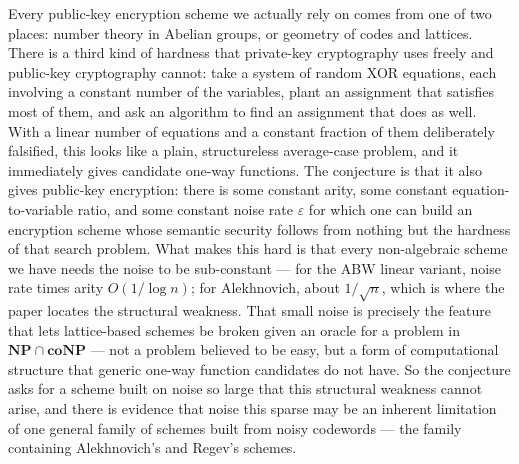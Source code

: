 \documentclass{aicr-conjecture}
\newcommand{\NP}{\mathbf{NP}}
\newcommand{\coNP}{\mathbf{coNP}}
\begin{document}

\vspace{0.4em}

\begin{informalconjecture}
Every public-key encryption scheme we actually rely on comes from one
of two places: number theory in Abelian groups, or geometry of codes
and lattices. There is a third kind of hardness that private-key
cryptography uses freely and public-key cryptography cannot: take a
system of random XOR equations, each involving a constant number of the
variables, plant an assignment that satisfies most of them, and ask an
algorithm to find an assignment that does as well. With a linear number
of equations and a constant fraction of them deliberately falsified,
this looks like a plain, structureless average-case problem, and it
immediately gives candidate one-way functions. The conjecture is that
it also gives public-key encryption: there is some constant arity, some
constant equation-to-variable ratio, and some constant noise rate
$\varepsilon$ for which one can build an encryption scheme whose
semantic security follows from nothing but the hardness of that search
problem. What makes this hard is that every non-algebraic scheme we
have needs the noise to be sub-constant --- for the ABW linear variant,
noise rate times arity $O(1/\log n)$; for Alekhnovich, about
$1/\sqrt{n}$, which is where the paper locates the structural weakness.
That small noise is precisely the feature that lets lattice-based
schemes be broken given an oracle for a problem in $\NP \cap \coNP$
--- not a problem believed to be easy, but a form of computational
structure that generic one-way function candidates do not have. So the
conjecture asks for a scheme built on noise so large that this
structural weakness cannot arise, and there is evidence that noise this
sparse may be an inherent limitation of one general family of schemes
built from noisy codewords --- the family containing Alekhnovich's and
Regev's schemes.
\end{informalconjecture}
\end{document}
